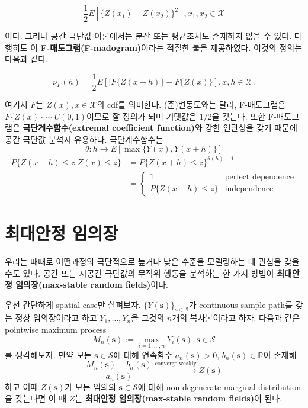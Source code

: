 \documentclass[b5paper,]{scrbook}
\theoremstyle{plain}
\theoremstyle{definition}
\numberwithin{equation}{section}
\begin{document}
\[
\begin{equation}
\frac{1}{2}E[\{Z(x_{1})-Z(x_{2}) \}^{2}], x_{1}, x_{2} \in \mathcal{X}
\end{equation}
\]

이다. 그러나 공간 극단값 이론에서는 분산 또는 평균조차도 존재하지 않을 수 있다. 다행히도 \citep{Cooley2006}이 \textbf{F-매도그램(F-madogram)}이라는 적절한 툴을 제공하였다. 이것의 정의는 다음과 같다.

\[
\begin{equation}
\nu_{F}(h)=\frac{1}{2}E[|F\{Z(x+h)\}-F\{Z(x)\}], x,h\in \mathcal{X}.
\end{equation}
\]

여기서 \(F\)는 \(Z(x), x\in\mathcal{X}\)의 cdf를 의미한다. (준)변동도와는 달리, F-매도그램은 \(F\{Z(x)\} \sim U(0,1)\)이므로 잘 정의가 되며 기댓값은 \(1/2\)을 갖는다. 또한 F-매도그램은 \textbf{극단계수함수(extremal coefficient function)}와 강한 연관성을 갖기 때문에 공간 극단값 분석시 유용하다. 극단계수함수는
\[\theta : h \rightarrow E[\max \{ Y(x),Y(x+h) \}]\]
\[
\begin{align*}
P\{Z(x+h)\leq z | Z(x)\leq z\}&=P\{Z(x+h)\leq z\}^{\theta(h)-1}\nonumber\\
&=
\begin{cases}
1 & \text{perfect dependence}\\
P\{Z(x+h)\leq z\} & \text{independence}
\end{cases}
\end{align*}
\]

\hypertarget{maxstableRF}{%
\chapter{최대안정 임의장}\label{maxstableRF}}

우리는 때때로 어떤과정의 극단적으로 높거나 낮은 수준을 모델링하는 데 관심을 갖을 수도 있다. 공간 또는 시공간 극단값의 무작위 행동을 분석하는 한 가지 방법이 \textbf{최대안정 임의장(max-stable random fields)}이다.

우선 간단하게 spatial case만 살펴보자. \(\{Y(\mathbf{s})\}_{\mathbf{s}\in\mathcal{S}}\)가 continuous sample path를 갖는 정상 임의장이라고 하고 \(Y_{1},\ldots, Y_{n}\)을 그것의 \(n\)개의 복사본이라고 하자. 다음과 같은 pointwise maximum process
\[M_{n}(\mathbf{s}):=\max_{i=1,\ldots,n}Y_{i}(\mathbf{s}), \mathbf{s}\in\mathcal{S}\]
를 생각해보자. 만약 모든 \(\mathbf{s}\in\mathcal{S}\)에 대해 연속함수 \(a_{n}(\mathbf{s})>0\), \(b_{n}(\mathbf{s})\in\mathbb{R}\)이 존재해
\[\frac{M_{n}(\mathbf{s})-b_{n}(\mathbf{s})}{a_{n}(\mathbf{s})} \stackrel{\text{converge weakly}}{\rightarrow}Z(\mathbf{s})\]
하고 이때 \(Z(\mathbf{s})\)가 모든 임의의 \(\mathbf{s}\in\mathcal{S}\)에 대해 non-degenerate marginal distribution을 갖는다면 이 때 \(Z\)는 \textbf{최대안정 임의장(max-stable random fields)}이 된다.
\end{document}
